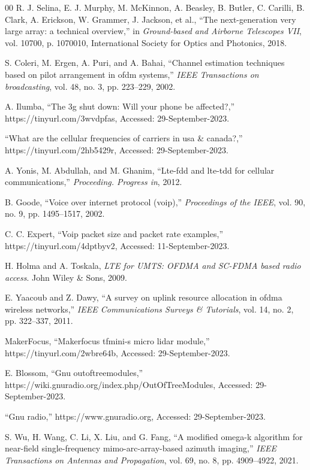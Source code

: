 \documentclass[journal, onecolumn]{IEEEtran}
\begin{document}
\begin{thebibliography}{00}
 R. J. Selina, E. J. Murphy, M. McKinnon, A. Beasley, B. Butler, C. Carilli, B. Clark, A. Erickson, W. Grammer, J. Jackson, et al., “The next-generation very large array: a technical overview,” in \emph{Ground-based and Airborne Telescopes VII}, vol. 10700, p. 1070010, International Society for Optics and Photonics, 2018.

 S. Coleri, M. Ergen, A. Puri, and A. Bahai, “Channel estimation techniques based on pilot arrangement in ofdm systems,” \emph{IEEE Transactions on broadcasting}, vol. 48, no. 3, pp. 223–229, 2002.

 A. Ilumba, “The 3g shut down: Will your phone be affected?,” https://tinyurl.com/3wvdpfas, Accessed: 29-September-2023.

 “What are the cellular frequencies of carriers in usa \& canada?,” https://tinyurl.com/2hb5429r, Accessed: 29-September-2023.

 A. Yonis, M. Abdullah, and M. Ghanim, “Lte-fdd and lte-tdd for cellular communications,” \emph{Proceeding. Progress in}, 2012.

 B. Goode, “Voice over internet protocol (voip),” \emph{Proceedings of the IEEE}, vol. 90, no. 9, pp. 1495–1517, 2002.

 C. C. Expert, “Voip packet size and packet rate examples,” https://tinyurl.com/4dptbyv2, Accessed: 11-September-2023.

 H. Holma and A. Toskala, \emph{LTE for UMTS: OFDMA and SC-FDMA based radio access}. John Wiley \& Sons, 2009.

 E. Yaacoub and Z. Dawy, “A survey on uplink resource allocation in ofdma wireless networks,” \emph{IEEE Communications Surveys \& Tutorials}, vol. 14, no. 2, pp. 322–337, 2011.

 MakerFocus, “Makerfocus tfmini-s micro lidar module,” https://tinyurl.com/2wbre64b, Accessed: 29-September-2023.

 E. Blossom, “Gnu outoftreemodules,” https://wiki.gnuradio.org/index.php/OutOfTreeModules, Accessed: 29-September-2023.

 “Gnu radio,” https://www.gnuradio.org, Accessed: 29-September-2023.

 S. Wu, H. Wang, C. Li, X. Liu, and G. Fang, “A modified omega-k algorithm for near-field single-frequency mimo-arc-array-based azimuth imaging,” \emph{IEEE Transactions on Antennas and Propagation}, vol. 69, no. 8, pp. 4909–4922, 2021.


\end{thebibliography}
\end{document}

